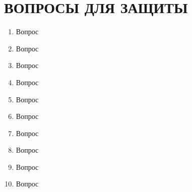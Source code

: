 \documentclass[12pt]{article}
\numberwithin{listing}{section}
\numberwithin{figure}{section}
\begin{document}
\pagebreak

\section{ВОПРОСЫ ДЛЯ ЗАЩИТЫ}
\begin{enumerate}
	\item Вопрос
	\item Вопрос
	\item Вопрос
	\item Вопрос
	\item Вопрос
	\item Вопрос
	\item Вопрос
	\item Вопрос
	\item Вопрос
	\item Вопрос
\end{enumerate}
\end{document}
